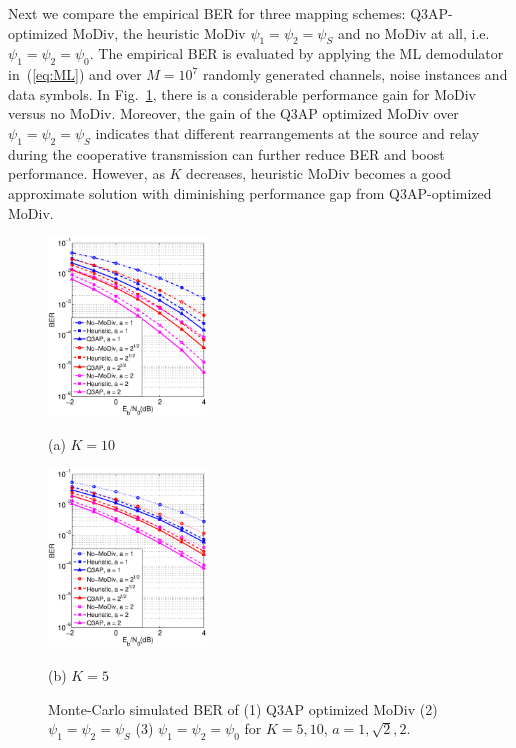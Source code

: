 \documentclass[journal]{IEEEtran}
\begin{document}
Next we compare the empirical BER for three mapping schemes: Q3AP-optimized
MoDiv, the heuristic MoDiv $\psi_1 = \psi_2 = \psi_S$ and no MoDiv at all,
i.e. $\psi_1 = \psi_2 = \psi_0$. The empirical BER is evaluated by applying the
ML demodulator in~(\ref{eq:ML}) and over $M=10^7$ randomly generated channels, 
noise instances and data symbols. In Fig.~\ref{fig:montecarlo}, there is a
considerable performance gain for MoDiv versus no MoDiv. Moreover, the gain of
the Q3AP optimized MoDiv over $\psi_1 = \psi_2 = \psi_S$ indicates that
different rearrangements at the source and relay during the cooperative
transmission can further reduce BER and boost performance. However, as $K$
decreases, heuristic MoDiv becomes a good approximate solution with diminishing
performance gap from Q3AP-optimized MoDiv.

\begin{figure}[!t]
    \begin{minipage}[b]{0.49\linewidth}
      \centering
      \centerline{\includegraphics[width=4.2cm]{./figs/MC_10.eps}}
      \centerline{(a) $ K = 10$}\medskip
    \end{minipage}
    \hfill
    \begin{minipage}[b]{0.49\linewidth}
      \centering
      \centerline{\includegraphics[width=4.2cm]{./figs/MC_5.eps}}
      \centerline{(b) $K=5$}\medskip
    \end{minipage}
    \caption{Monte-Carlo simulated BER of (1) Q3AP optimized MoDiv
    (2) $\psi_1 = \psi_2 = \psi_S$ (3) $\psi_1 = \psi_2 = \psi_0$ for $K = 5,
    10$, $a = 1, \sqrt{2}, 2$.}
    \label{fig:montecarlo}
\end{figure}
\end{document}
